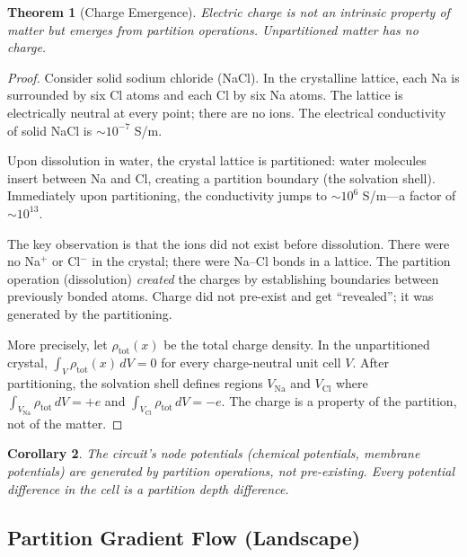 \documentclass[twocolumn,10pt,a4paper]{article}
\newtheorem{theorem}{Theorem}[section]
\newtheorem{corollary}[theorem]{Corollary}
\theoremstyle{definition}
\theoremstyle{remark}
\begin{document}
\begin{theorem}[Charge Emergence]
\label{thm:charge}
Electric charge is not an intrinsic property of matter but emerges from partition operations. Unpartitioned matter has no charge.
\end{theorem}

\begin{proof}
Consider solid sodium chloride (NaCl). In the crystalline lattice, each Na is surrounded by six Cl atoms and each Cl by six Na atoms. The lattice is electrically neutral at every point; there are no ions. The electrical conductivity of solid NaCl is $\sim 10^{-7}$ S/m.

Upon dissolution in water, the crystal lattice is partitioned: water molecules insert between Na and Cl, creating a partition boundary (the solvation shell). Immediately upon partitioning, the conductivity jumps to $\sim 10^{6}$ S/m---a factor of $\sim 10^{13}$.

The key observation is that the ions did not exist before dissolution. There were no Na$^+$ or Cl$^-$ in the crystal; there were Na--Cl bonds in a lattice. The partition operation (dissolution) \emph{created} the charges by establishing boundaries between previously bonded atoms. Charge did not pre-exist and get ``revealed''; it was generated by the partitioning.

More precisely, let $\rho_{\mathrm{tot}}(x)$ be the total charge density. In the unpartitioned crystal, $\int_V \rho_{\mathrm{tot}}(x) \, dV = 0$ for every charge-neutral unit cell $V$. After partitioning, the solvation shell defines regions $V_{\mathrm{Na}}$ and $V_{\mathrm{Cl}}$ where $\int_{V_{\mathrm{Na}}} \rho_{\mathrm{tot}} \, dV = +e$ and $\int_{V_{\mathrm{Cl}}} \rho_{\mathrm{tot}} \, dV = -e$. The charge is a property of the partition, not of the matter.
\end{proof}

\begin{corollary}
\label{cor:circuit_voltages}
The circuit's node potentials (chemical potentials, membrane potentials) are generated by partition operations, not pre-existing. Every potential difference in the cell is a partition depth difference.
\end{corollary}

\subsection{Partition Gradient Flow (Landscape)}
\label{sec:landscape}
\end{document}
